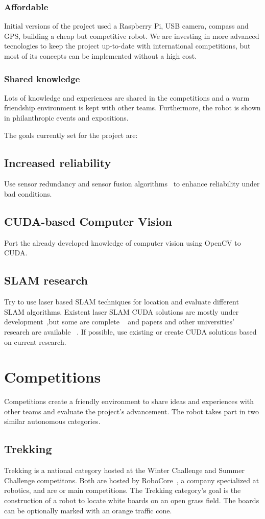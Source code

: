 \documentclass[conference]{IEEEtran}
\begin{document}
\subsubsection{Affordable}
Initial versions of the project used a Raspberry Pi, USB camera, compass and
GPS, building a cheap but competitive robot. We are investing in more advanced
tecnologies to keep the project up-to-date with international competitions, but
most of its concepts can be implemented without a high cost.
\subsubsection{Shared knowledge}
Lots of knowledge and experiences are shared in the competitions and a warm
friendship environment is kept with other teams. Furthermore, the robot is
shown in philanthropic events and expositions.

\medskip
The goals currently set for the project are:
\setcounter{subsection}{0}
\subsection{Increased reliability} Use sensor redundancy and sensor fusion
algorithms~\cite{kalman} to enhance reliability under bad conditions.
\subsection{CUDA-based Computer Vision} Port the already developed knowledge of
computer vision using OpenCV to CUDA.
\subsection{SLAM research} Try to use laser based SLAM techniques for
location and evaluate different SLAM algorithms. Existent laser SLAM CUDA
solutions are mostly under development~\cite{CUDA-PHDSLAM},but some are complete
~\cite{rgbdslam_v2} and papers and other universities' research are available
~\cite{CUDA-IEEE}. If possible, use existing or create CUDA solutions based on current
research.

\section{Competitions}
\setcounter{subsection}{0}
Competitions create a friendly environment to share ideas and experiences with
other teams and evaluate the project's advancement. The robot takes part in two
similar autonomous categories.
\subsection{Trekking}
Trekking is a national category hosted at the Winter Challenge and Summer
Challenge competitons. Both are hosted by RoboCore~\cite{RoboCore}, a company
specialized at robotics, and are or main competitions. The Trekking category's
goal is the construction of a robot to locate white boards on an open grass field.
The boards can be optionally marked with an orange traffic cone.
\end{document}
